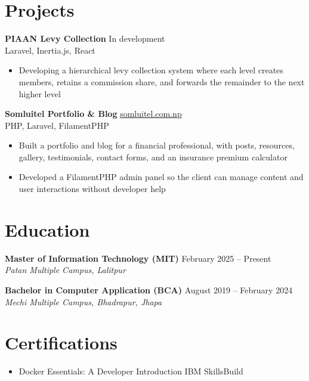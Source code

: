 \documentclass[10pt, a4paper]{article}
\newcommand{\project}[4]{%
    \noindent
    \textbf{#1} \hfill \href{#4}{#3} \\
    #2
    \vspace{2pt}
}
\begin{document}
\section{Projects}

\noindent
\textbf{PIAAN Levy Collection} \hfill In development \\
Laravel, Inertia.js, React
\vspace{2pt}
\begin{itemize}
    \item Developing a hierarchical levy collection system where each level creates members, retains a commission share, and forwards the remainder to the next higher level
\end{itemize}

\vspace{6pt}

\project{Somluitel Portfolio \& Blog}{PHP, Laravel, FilamentPHP}{somluitel.com.np}{https://somluitel.com.np}
\begin{itemize}
    \item Built a portfolio and blog for a financial professional, with posts, resources, gallery, testimonials, contact forms, and an insurance premium calculator
    \item Developed a FilamentPHP admin panel so the client can manage content and user interactions without developer help
\end{itemize}

\section{Education}

\noindent
\textbf{Master of Information Technology (MIT)} \hfill February 2025 -- Present \\
\textit{Patan Multiple Campus, Lalitpur}

\vspace{6pt}

\noindent
\textbf{Bachelor in Computer Application (BCA)} \hfill August 2019 -- February 2024 \\
\textit{Mechi Multiple Campus, Bhadrapur, Jhapa}

\section{Certifications}

\begin{itemize}
    \item Docker Essentials: A Developer Introduction \textemdash{} IBM SkillsBuild
\end{itemize}
\end{document}
